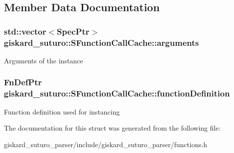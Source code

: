 \subsection{Member Data Documentation}
\hypertarget{structgiskard__suturo_1_1SFunctionCallCache_ad522b77747b469ad5c507f26dd6c74ae}{
\subsubsection[{arguments}]{\setlength{\rightskip}{0pt plus 5cm}std\-::vector$<$Spec\-Ptr$>$ giskard\-\_\-suturo\-::\-S\-Function\-Call\-Cache\-::arguments}}\label{structgiskard__suturo_1_1SFunctionCallCache_ad522b77747b469ad5c507f26dd6c74ae}
Arguments of the instance \hypertarget{structgiskard__suturo_1_1SFunctionCallCache_ab6e8b1ddb5c910291204be2de2d633df}{
\subsubsection[{function\-Definition}]{\setlength{\rightskip}{0pt plus 5cm}Fn\-Def\-Ptr giskard\-\_\-suturo\-::\-S\-Function\-Call\-Cache\-::function\-Definition}}\label{structgiskard__suturo_1_1SFunctionCallCache_ab6e8b1ddb5c910291204be2de2d633df}
Function definition used for instancing 

The documentation for this struct was generated from the following file\-:\begin{DoxyCompactItemize}
\item 
giskard\-\_\-suturo\-\_\-parser/include/giskard\-\_\-suturo\-\_\-parser/functions.\-h\end{DoxyCompactItemize}
